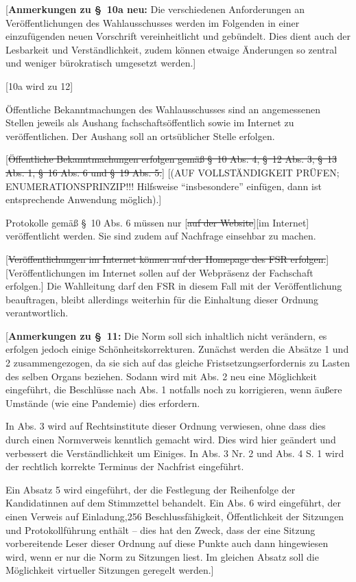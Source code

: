 \documentclass[%
draft,%
multilinesections%
]{fswo}
\newcommand\oldT[1]  {{\color{Gray}[\st{#1}]}}
\newcommand\newT[1]  {{\color{Green}[#1]}}
\newcommand\bemFr[1] {{\color{Red}[#1]}}
\newcommand\bemFe[1] {{\color{Cyan}[#1]}}
\newcommand\oldT[1]{}%
\newcommand\newT[1]{#1}
\newcommand\bemFr[1]{}%
\newcommand\bemFe[1]{}%
\newcommand\change[2]{\oldT{#1}\newT{#2}}
\begin{document}
\bemFr{\textbf{Anmerkungen zu \S~10a neu:}
Die verschiedenen Anforderungen an Veröffentlichungen des Wahlausschusses werden im Folgenden in einer einzufügenden neuen Vorschrift vereinheitlicht und gebündelt.
Dies dient auch der Lesbarkeit und Verständlichkeit, zudem können etwaige Änderungen so zentral und weniger bürokratisch umgesetzt werden.}

\bemFe{10a wird zu 12}

\begin{contract}
Öffentliche Bekanntmachungen des Wahlausschusses sind an angemessenen Stellen jeweils als Aushang fachschaftsöffentlich sowie im Internet zu veröffentlichen.
Der Aushang soll an ortsüblicher Stelle erfolgen.

\oldT{Öffentliche Bekanntmachungen erfolgen gemäß \S~10 Abs. 4, \S~12 Abs. 3, \S~13 Abs. 1, \S~16 Abs. 6 und \S~19 Abs. 5.} \bemFr{(AUF VOLLSTÄNDIGKEIT PRÜFEN; ENUMERATIONSPRINZIP!!! Hilfsweise \enquote{insbesondere} einfügen, dann ist entsprechende Anwendung möglich).}

Protokolle gemäß \S~10 Abs. 6 müssen nur \change{auf der Website}{im Internet} veröffentlicht werden.
Sie sind zudem auf Nachfrage einsehbar zu machen.

\change{Veröffentlichungen im Internet können auf der Homepage des FSR erfolgen.}{Veröffentlichungen im Internet sollen auf der Webpräsenz der Fachschaft erfolgen.}
Die Wahlleitung darf den FSR in diesem Fall mit der Veröffentlichung beauftragen, bleibt allerdings weiterhin für die Einhaltung dieser Ordnung verantwortlich.
\end{contract}

\bemFr{\textbf{Anmerkungen zu \S~11:}
Die Norm soll sich inhaltlich nicht verändern, es erfolgen jedoch einige Schönheitskorrekturen.
Zunächst werden die Absätze 1 und 2 zusammengezogen, da sie sich auf das gleiche Fristsetzungserfordernis zu Lasten des selben Organs beziehen.
Sodann wird mit Abs. 2 neu eine Möglichkeit eingeführt, die Beschlüsse nach Abs. 1 notfalls noch zu korrigieren,
wenn äußere Umstände (wie eine Pandemie) dies erfordern.

In Abs. 3 wird auf Rechtsinstitute dieser Ordnung verwiesen, ohne dass dies durch einen Normverweis kenntlich gemacht wird.
Dies wird hier geändert und verbessert die Verständlichkeit um Einiges.
In Abs. 3 Nr. 2 und Abs. 4 S. 1 wird der rechtlich korrekte Terminus der Nachfrist eingeführt.

Ein Absatz 5 wird eingeführt, der die Festlegung der Reihenfolge der Kandidatinnen auf dem Stimmzettel behandelt.
Ein Abs. 6 wird eingeführt, der einen Verweis auf Einladung,256 Beschlussfähigkeit, Öffentlichkeit der Sitzungen und Protokollführung enthält –
dies hat den Zweck, dass der eine Sitzung vorbereitende Leser dieser Ordnung auf diese Punkte auch dann hingewiesen wird,
wenn er nur die Norm zu Sitzungen liest. Im gleichen Absatz soll die Möglichkeit virtueller Sitzungen geregelt werden.}
\end{document}

